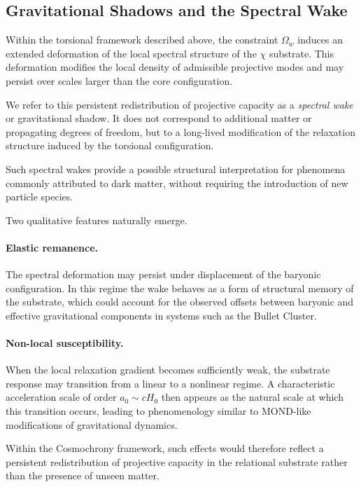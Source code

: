 \subsection{Gravitational Shadows and the Spectral Wake}
  \label{sec:gravitational-shadows}

  Within the torsional framework described above,
  the constraint $\Omega_w$ induces an extended deformation of the
  local spectral structure of the $\chi$ substrate.
  This deformation modifies the local density of admissible projective modes
  and may persist over scales larger than the core configuration.

  We refer to this persistent redistribution of projective capacity as a
  \emph{spectral wake} or gravitational shadow.
  It does not correspond to additional matter or propagating degrees of
  freedom, but to a long-lived modification of the relaxation structure
  induced by the torsional configuration.

  Such spectral wakes provide a possible structural interpretation for
  phenomena commonly attributed to dark matter, without requiring the
  introduction of new particle species.

  Two qualitative features naturally emerge.

  \paragraph*{Elastic remanence.}
    The spectral deformation may persist under displacement of the
    baryonic configuration.
    In this regime the wake behaves as a form of structural memory of the
    substrate, which could account for the observed offsets between
    baryonic and effective gravitational components in systems such as
    the Bullet Cluster.

  \paragraph*{Non-local susceptibility.}
    When the local relaxation gradient becomes sufficiently weak,
    the substrate response may transition from a linear to a nonlinear
    regime.
    A characteristic acceleration scale of order
    \(
    a_0 \sim c H_0
    \)
    then appears as the natural scale at which this transition occurs,
    leading to phenomenology similar to MOND-like modifications of
    gravitational dynamics.

    Within the Cosmochrony framework, such effects would therefore
    reflect a persistent redistribution of projective capacity in the
    relational substrate rather than the presence of unseen matter.

